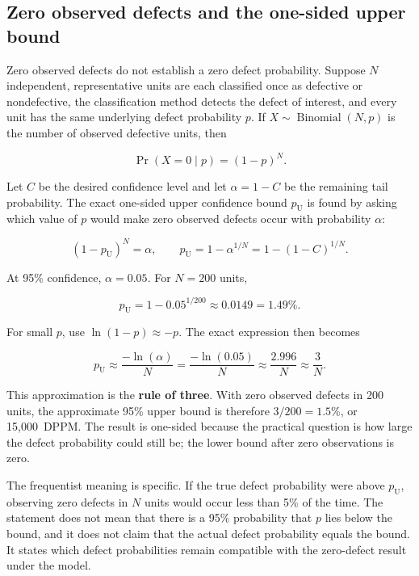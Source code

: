 \subsection{Zero observed defects and the one-sided upper bound}
\label{sec:mfg-zero-defect-bound}

Zero observed defects do not establish a zero defect probability. Suppose
$N$ independent, representative units are each classified once as defective or
nondefective, the classification method detects the defect of interest, and
every unit has the same underlying defect probability $p$. If
$X\sim\operatorname{Binomial}(N,p)$ is the number of observed defective units,
then

\begin{equation}
\Pr(X=0\mid p)=(1-p)^N.
\end{equation}

Let $C$ be the desired confidence level and let
$\alpha=1-C$ be the remaining tail probability. The exact one-sided upper
confidence bound $p_{\mathrm{U}}$ is found by asking which value of $p$ would
make zero observed defects occur with probability $\alpha$:

\begin{equation}
(1-p_{\mathrm{U}})^N=\alpha,
\qquad
p_{\mathrm{U}}=1-\alpha^{1/N}
=1-(1-C)^{1/N}.
\label{eq:mfg-zero-defect-bound}
\end{equation}

At 95\% confidence, $\alpha=0.05$. For $N=200$ units,

\begin{equation}
p_{\mathrm{U}}
=1-0.05^{1/200}
\approx 0.0149
=1.49\%.
\end{equation}

For small $p$, use $\ln(1-p)\approx-p$. The exact expression then becomes

\begin{equation}
p_{\mathrm{U}}
\approx\frac{-\ln(\alpha)}{N}
=\frac{-\ln(0.05)}{N}
\approx\frac{2.996}{N}
\approx\frac{3}{N}.
\label{eq:mfg-rule-of-three}
\end{equation}

This approximation is the \textbf{rule of three}. With zero observed defects
in 200 units, the approximate 95\% upper bound is therefore $3/200=1.5\%$, or
15{,}000~DPPM. The result is one-sided because the practical question is how
large the defect probability could still be; the lower bound after zero
observations is zero.

The frequentist meaning is specific. If the true defect probability were above
$p_{\mathrm{U}}$, observing zero defects in $N$ units would occur less than 5\%
of the time. The statement does not mean that there is a 95\% probability that
$p$ lies below the bound, and it does not claim that the actual defect
probability equals the bound. It states which defect probabilities remain
compatible with the zero-defect result under the model.

